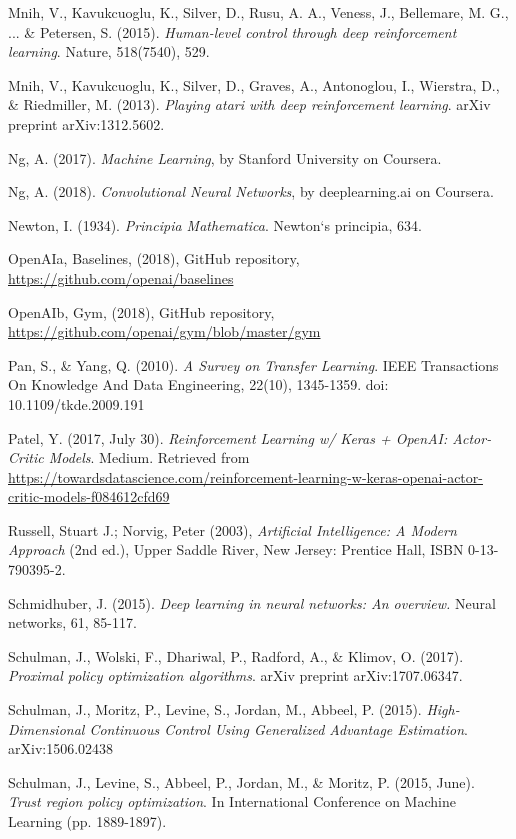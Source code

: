 \begin{thebibliography}{99}
\bibitem{} Mnih, V., Kavukcuoglu, K., Silver, D., Rusu, A. A., Veness, J., Bellemare, M. G., ... \& Petersen, S. (2015). \textit{Human-level control through deep reinforcement learning}. Nature, 518(7540), 529.

\bibitem{} Mnih, V., Kavukcuoglu, K., Silver, D., Graves, A., Antonoglou, I., Wierstra, D., \& Riedmiller,
M. (2013). \textit{Playing atari with deep reinforcement learning}. arXiv preprint arXiv:1312.5602.

\bibitem{} Ng, A. (2017).\textit{ Machine Learning}, by Stanford University on Coursera.

\bibitem{} Ng, A. (2018). \textit{Convolutional Neural Networks}, by deeplearning.ai on Coursera.

\bibitem{} Newton, I. (1934). \textit{Principia Mathematica}. Newton`s principia, 634.

\bibitem{} OpenAIa, Baselines, (2018), GitHub repository, \url{https://github.com/openai/baselines}

\bibitem{} OpenAIb, Gym, (2018), GitHub repository, \url{https://github.com/openai/gym/blob/master/gym}

\bibitem{} Pan, S., \& Yang, Q. (2010). \textit{A Survey on Transfer Learning}. IEEE Transactions On Knowledge And Data Engineering, 22(10), 1345-1359. doi: 10.1109/tkde.2009.191

\bibitem{} Patel, Y. (2017, July 30). \textit{Reinforcement Learning w/ Keras + OpenAI: Actor-Critic Models}.
Medium. Retrieved from \url{https://towardsdatascience.com/reinforcement-learning-w-keras-openai-actor-critic-models-f084612cfd69}

\bibitem{} Russell, Stuart J.; Norvig, Peter (2003),\textit{ Artificial Intelligence: A Modern Approach} (2nd ed.), Upper Saddle River, New Jersey: Prentice Hall, ISBN 0-13-790395-2.

\bibitem{} Schmidhuber, J. (2015).\textit{ Deep learning in neural networks: An overview.} Neural networks,
61, 85-117.

\bibitem{} Schulman, J., Wolski, F., Dhariwal, P., Radford, A., \& Klimov, O. (2017). \textit{Proximal policy
optimization algorithms}. arXiv preprint arXiv:1707.06347.

\bibitem{} Schulman, J., Moritz, P., Levine, S., Jordan, M., Abbeel, P. (2015). \textit{High-Dimensional Continuous Control Using Generalized Advantage Estimation}. arXiv:1506.02438

\bibitem{} Schulman, J., Levine, S., Abbeel, P., Jordan, M., \& Moritz, P. (2015, June). \textit{Trust region policy optimization}. In International Conference on Machine Learning (pp. 1889-1897).


\end{thebibliography}

